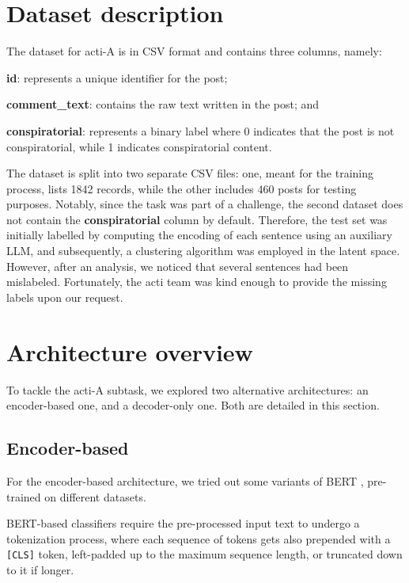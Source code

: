 \documentclass[11pt]{article}
\begin{document}
\section{Dataset description}\label{sec:dataset-description}
The dataset for \ac{acti}-A is in CSV format and contains three columns, namely:
\begin{enumerate*}[label=(\roman*)]
  \item \textbf{id}: represents a unique identifier for the post;
  \item \textbf{comment\_text}: contains the raw text written in the post; and
  \item \textbf{conspiratorial}: represents a binary label where 0 indicates that the post is not conspiratorial,
    while 1 indicates conspiratorial content.
\end{enumerate*}
The dataset is split into two separate CSV files: one, meant for the training process, lists
1842 records, while the other includes 460 posts for testing purposes.
%
Notably, since the task was part of a challenge, the second dataset does not contain the
\textbf{conspiratorial} column by default. 
%
Therefore, the test set was initially labelled by computing the encoding of each sentence using an auxiliary LLM, 
and subsequently, a clustering algorithm was employed in the latent space.
%
However, after an analysis, we noticed that several sentences had been mislabeled. 
%
Fortunately, the \ac{acti} team was kind enough to provide the
missing labels upon our request.

\section{Architecture overview}\label{sec:architecture-overview}
To tackle the \ac{acti}-A subtask, we explored two alternative architectures: an encoder-based one, and
a decoder-only one. Both are detailed in this section.

\subsection{Encoder-based}
For the encoder-based architecture, we tried out some variants of BERT \cite{devlin-etal-2019-bert}, pre-trained on different
datasets.

BERT-based classifiers require the pre-processed input text to undergo a tokenization process, where each
sequence of tokens gets also prepended with a \texttt{[CLS]} token, left-padded up to the maximum sequence
length, or truncated down to it if longer.
\end{document}
